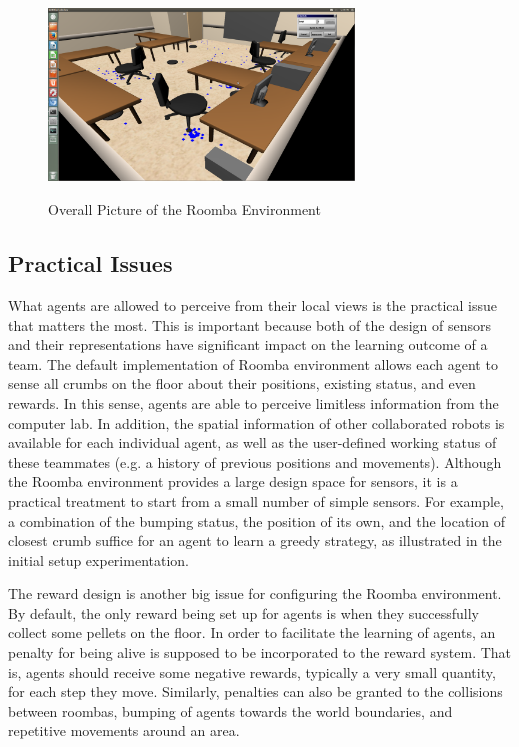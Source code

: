 \documentclass[conference]{IEEEtran}
\begin{document}
\begin{figure}[!t]
\centering
\includegraphics[width=3.2in,height=2.1in]{./figures/roombas/roomba2.png}
\caption{Overall Picture of the Roomba Environment}
\label{roomba:world}
\end{figure}

\subsection{Practical Issues}
What agents are allowed to perceive from their local views is the practical
issue that matters the most. 
This is important because both of the design of sensors and their
representations have significant impact on the learning outcome of a team. 
The default implementation of Roomba environment allows each agent to sense
all crumbs on the floor about their positions, existing status, and even rewards. 
In this sense, agents are able to perceive limitless information from the
computer lab. 
In addition, the spatial information of other collaborated robots
is available for each individual agent, as well as the user-defined working
status of these teammates (e.g. a history of previous positions and
movements).  Although the Roomba environment provides a large design space for
sensors, it is a practical treatment to start from a small number of simple
sensors. For example, a combination of the bumping status, the position of its
own, and the location of closest crumb suffice for an agent to learn a greedy
strategy, as illustrated in the initial setup experimentation.  

The reward design is another big issue for
configuring the Roomba environment. By default, the only reward being set up
for agents is when they successfully collect some pellets on the floor. In
order to facilitate the learning of agents, an penalty for being alive is
supposed to be incorporated to the reward system. That is, agents should
receive some negative rewards, typically a very small quantity, for each step
they move. Similarly, penalties can also be granted to the collisions between
roombas, bumping of agents towards the world boundaries, and repetitive
movements around an area.
\end{document}
